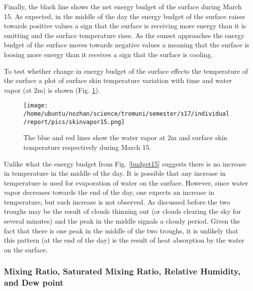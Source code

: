 \documentclass[a4paper,12pt]{article}
\numberwithin{equation}{section} %
\begin{document}
Finally, the black line shows the net energy budget of the surface during March 15. As expected, in the middle of the day the energy budget of the surface raises towards positive values a sign that the surface is receiving more energy than it is emitting and the surface temperature rises. As the sunset approaches the energy budget of the surface moves towards negative values a meaning that the surface is loosing more energy than it receives a sign that the surface is cooling.

To test whether change in energy budget of the surface effects the temperature of the surface a plot of surface skin temperature variation with time and water vapor (at 2m) is shown (Fig. \ref{skinvapor15}). 

\vspace{1cm}

\begin{figure}[bhp]
\texttt{[image: /home/ubuntu/nozhan/science/tromuni/semester/s17/individual/report/pics/skinvapor15.png]}
\caption{The blue and red lines show the water vapor at 2m and surface skin temperature respectively during March 15.}
\label{skinvapor15}
\end{figure}

\vspace{1cm}

Unlike what the energy budget from Fig. \ref{budget15} suggests there is no increase in temperature in the middle of the day. It is possible that any increase in temperature is used for evaporation of water on the surface. However, since water vapor decreases towards the end of the day, one expects an increase in temperature, but such increase is not observed. As discussed before the two troughs may be the result of clouds thinning out (or clouds clearing the sky for several minutes) and the peak in the middle signals a cloudy period. Given the fact that there is one peak in the middle of the two troughs, it is unlikely that this pattern (at the end of the day) is the result of heat absorption by the water on the surface.


\subsubsection{Mixing Ratio, Saturated Mixing Ratio, Relative Humidity, and Dew point}
\end{document}
